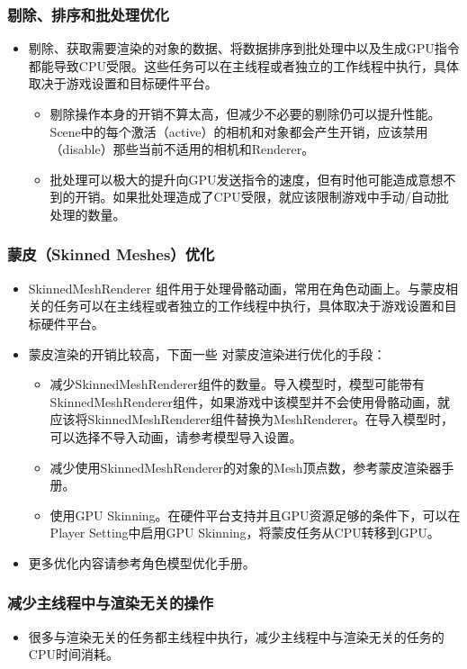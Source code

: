 \documentclass[9pt, b5paper]{article}
\begin{document}
\subsubsection{剔除、排序和批处理优化}
\label{sec-6-3-6}
\begin{itemize}
\item 剔除、获取需要渲染的对象的数据、将数据排序到批处理中以及生成GPU指令都能导致CPU受限。这些任务可以在主线程或者独立的工作线程中执行，具体取决于游戏设置和目标硬件平台。
\begin{itemize}
\item 剔除操作本身的开销不算太高，但减少不必要的剔除仍可以提升性能。Scene中的每个激活（active）的相机和对象都会产生开销，应该禁用（disable）那些当前不适用的相机和Renderer。
\item 批处理可以极大的提升向GPU发送指令的速度，但有时他可能造成意想不到的开销。如果批处理造成了CPU受限，就应该限制游戏中手动/自动批处理的数量。
\end{itemize}
\end{itemize}
\subsubsection{蒙皮（Skinned Meshes）优化}
\label{sec-6-3-7}
\begin{itemize}
\item SkinnedMeshRenderer 组件用于处理骨骼动画，常用在角色动画上。与蒙皮相关的任务可以在主线程或者独立的工作线程中执行，具体取决于游戏设置和目标硬件平台。
\item 蒙皮渲染的开销比较高，下面一些 对蒙皮渲染进行优化的手段：
\begin{itemize}
\item 减少SkinnedMeshRenderer组件的数量。导入模型时，模型可能带有SkinnedMeshRenderer组件，如果游戏中该模型并不会使用骨骼动画，就应该将SkinnedMeshRenderer组件替换为MeshRenderer。在导入模型时，可以选择不导入动画，请参考模型导入设置。
\item 减少使用SkinnedMeshRenderer的对象的Mesh顶点数，参考蒙皮渲染器手册。
\item 使用GPU Skinning。在硬件平台支持并且GPU资源足够的条件下，可以在Player Setting中启用GPU Skinning，将蒙皮任务从CPU转移到GPU。
\end{itemize}
\item 更多优化内容请参考角色模型优化手册。
\end{itemize}
\subsubsection{减少主线程中与渲染无关的操作}
\label{sec-6-3-8}
\begin{itemize}
\item 很多与渲染无关的任务都主线程中执行，减少主线程中与渲染无关的任务的CPU时间消耗。
\end{itemize}
\end{document}
